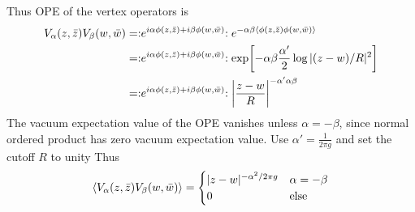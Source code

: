 Thus OPE of the vertex operators is
\begin{align*}
	V_\alpha (z, \bar{z}) V_\beta (w, \bar{w}) &= :\mathrel{e^{i\alpha \phi(z,\bar{z}) + i\beta\phi(w,\bar{w})}}: e^{-\alpha\beta \expval{\phi(z,\bar{z})\phi(w,\bar{w})}} \\
															 &= :\mathrel{e^{i\alpha \phi(z,\bar{z}) + i\beta\phi(w,\bar{w})}}: \exp[-\alpha\beta \frac{\alpha'}{2} \log|(z-w)/R|^2] \\
															 &= :\mathrel{e^{i\alpha \phi(z,\bar{z}) + i\beta\phi(w,\bar{w})}}: \left| \frac{z-w}{R} \right|^{-\alpha' \alpha\beta}
\end{align*}
The vacuum expectation value of the OPE vanishes unless $\alpha = -\beta$, since normal ordered product has zero vacuum expectation value. Use $\alpha'=\frac{1}{2\pi g}$ and set the cutoff $R$ to unity  Thus
\begin{equation}
	\expval{V_\alpha (z, \bar{z}) V_\beta (w, \bar{w})} = 
	\begin{cases}
		|z-w|^{-\alpha^2/2\pi g} & \alpha = -\beta \\
		0 & \text{else}
	\end{cases}
\end{equation}
